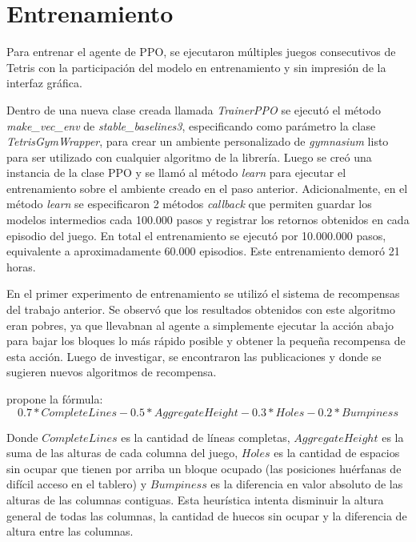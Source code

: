 \section{Entrenamiento}
\label{sec:entrenamiento}

Para entrenar el agente de PPO, se ejecutaron múltiples juegos consecutivos de Tetris con la participación del modelo en entrenamiento y sin impresión de la interfaz gráfica. 

Dentro de una nueva clase creada llamada \textit{TrainerPPO} se ejecutó el método \textit{make\_vec\_env} de \textit{stable\_baselines3}, especificando como parámetro la clase \textit{TetrisGymWrapper}, para crear un ambiente personalizado de \textit{gymnasium} listo para ser utilizado con cualquier algoritmo de la librería. Luego se creó una instancia de la clase PPO y se llamó al método \textit{learn} para ejecutar el entrenamiento sobre el ambiente creado en el paso anterior. Adicionalmente, en el método \textit{learn} se especificaron 2 métodos \textit{callback} que permiten guardar los modelos intermedios cada 100.000 pasos y registrar los retornos obtenidos en cada episodio del juego. En total el entrenamiento se ejecutó por 10.000.000 pasos, equivalente a aproximadamente 60.000 episodios. Este entrenamiento demoró 21 horas.

En el primer experimento de entrenamiento se utilizó el sistema de recompensas del trabajo anterior. Se observó que los resultados obtenidos con este algoritmo eran pobres, ya que llevabnan al agente a simplemente ejecutar la acción abajo para bajar los bloques lo más rápido posible y obtener la pequeña recompensa de esta acción. Luego de investigar, se encontraron las publicaciones \citep{ARTICLE:1} y \citep{ARTICLE:2} donde se sugieren nuevos algoritmos de recompensa.

\citep{ARTICLE:1} propone la fórmula:
\begin{equation}
    0.7*CompleteLines-0.5*AggregateHeight-0.3*Holes-0.2*Bumpiness
\end{equation}

Donde \(CompleteLines\) es la cantidad de líneas completas, \(AggregateHeight\) es la suma de las alturas de cada columna del juego, \(Holes\) es la cantidad de espacios sin ocupar que tienen por arriba un bloque ocupado (las posiciones huérfanas de difícil acceso en el tablero) y \(Bumpiness\) es la diferencia en valor absoluto de las alturas de las columnas contiguas. Esta heurística intenta disminuir la altura general de todas las columnas, la cantidad de huecos sin ocupar y la diferencia de altura entre las columnas.

